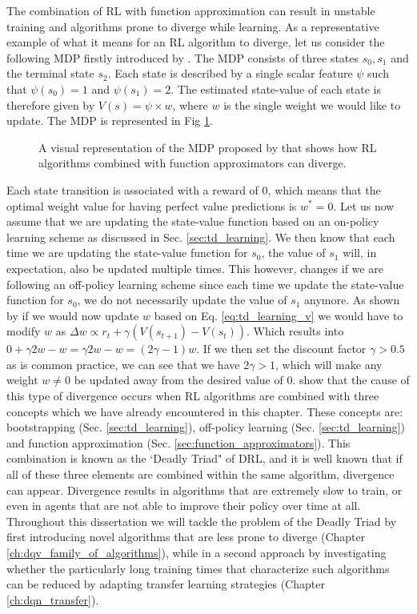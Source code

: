 The combination of RL with function approximation can result in unstable training and algorithms prone to diverge while learning. As a representative example of what it means for an RL algorithm to diverge, let us consider the following MDP firstly introduced by \citet{tsitsiklis1997analysis}. The MDP consists of three states $s_0, s_1$ and the terminal state $s_2$. Each state is described by a single scalar feature $\psi$ such that $\psi(s_0)=1$ and $\psi(s_1)=2$. The estimated state-value of each state is therefore given by $V(s)=\psi \times w$, where $w$ is the single weight we would like to update. The MDP is represented in Fig \ref{fig:deadly_triad}.  
\begin{figure}[ht!]
	\centering
	
\caption{A visual representation of the MDP proposed by \citet{tsitsiklis1997analysis} that shows how RL algorithms combined with function approximators can diverge.}
\label{fig:deadly_triad}
\end{figure}
Each state transition is associated with a reward of $0$, which means that the optimal weight value for having perfect value predictions is $w^{*}=0$. Let us now assume that we are updating the state-value function based on an on-policy learning scheme as discussed in Sec. \ref{sec:td_learning}. We then know that each time we are updating the state-value function for $s_0$, the value of $s_1$ will, in expectation, also be updated multiple times. This however, changes if we are following an off-policy learning scheme since each time we update the state-value function for $s_0$, we do not necessarily update the value of $s_1$ anymore. As shown by \citet{van2018deep_triad} if we would now update $w$ based on Eq. \ref{eq:td_learning_v} we would have to modify $w$ as $\Delta w \propto r_t +\gamma(V(s_{t+1})-V(s_t))$. Which results into $0+\gamma 2w-w=\gamma 2w-w=(2\gamma-1)w$. If we then set the discount factor $\gamma>0.5$ as is common practice, we can see that we have $2\gamma>1$, which will make any weight $w\neq0$  be updated away from the desired value of $0$. \citet{sutton2018reinforcement} show that the cause of this type of divergence occurs when RL algorithms are combined with three concepts which we have already encountered in this chapter. These concepts are: bootstrapping (Sec. \ref{sec:td_learning}), off-policy learning (Sec. \ref{sec:td_learning}) and function approximation (Sec. \ref{sec:function_approximators}).
This combination is known as the `Deadly Triad" of DRL, and it is well known that if all of these three elements are combined within the same algorithm, divergence can appear. Divergence results in algorithms that are extremely slow to train, or even in agents that are not able to improve their policy over time at all. Throughout this dissertation we will tackle the problem of the Deadly Triad by first introducing novel algorithms that are less prone to diverge (Chapter \ref{ch:dqv_family_of_algorithms}), while in a second approach by investigating whether the particularly long training times that characterize such algorithms can be reduced by adapting transfer learning strategies (Chapter \ref{ch:dqn_transfer}).   




